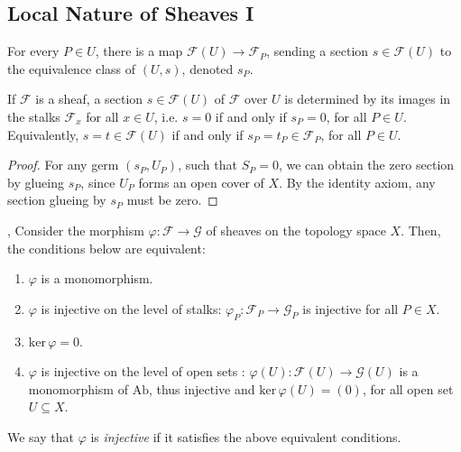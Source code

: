 \documentclass[11pt]{article}
\begin{document}
\subsection{Local Nature of Sheaves I}

\begin{lemma}
    \label{lemma: taking stalks}
    For every $P \in U$, there is a map 
    $\mathscr{F}(U) \to \mathscr{F}_{P}$, 
    sending a section $s \in \mathscr{F}(U)$ to 
    the equivalence class of $(U,s)$, denoted $s_{P}$. 

    If $\mathscr{F}$ is a sheaf, 
    a section $s \in \mathscr{F}(U)$ of $\mathscr{F}$ over $U$ 
    is determined by its images in the stalks $\mathscr{F}_{x}$ 
    for all $x \in U$, i.e. $s=0$ if and only if 
    $s_{P}=0$, for all $P \in U$. 
    Equivalently, $s=t \in \mathscr{F}(U)$ 
    if and only if $s_{P}=t_{P} \in \mathscr{F}_{P}$, 
    for all $P \in U$.
\end{lemma}

\begin{proof}
    For any germ $ (s_{P},U_{P}) $, such that $ S_{P}=0 $, 
    we can obtain the zero section by glueing $ s_{P} $, 
    since $ U_{P} $ forms an open cover of $ X $. 
    By the identity axiom, any section glueing by $ s_{P} $ 
    must be zero. 
\end{proof}

\begin{proposition}
    \label{prop: injective morphisms}
    \cite[2.4 N]{vakilTheRisingSea}, \cite[Exercise II.1.3]{hartsAG} 
    Consider the morphism $\varphi:\mathscr{F} \to \mathscr{G}$ 
    of sheaves on the topology space $X$. 
    Then, the conditions below are equivalent: 
    \begin{enumerate}[label = (\arabic*)]
    \item $\varphi$ is a monomorphism. 
    \item $\varphi$ is injective on the level 
        of stalks: $\varphi_{P}:\mathscr{F}_{P}\to \mathscr{G}_{P}$ 
        is injective for all $P \in X$. 
    \item $\mathrm{ker}\,\varphi=0$.  
    \item $\varphi$ is injective on the level of open 
    sets : $\varphi(U): \mathscr{F}(U) \to \mathscr{G}(U)$ 
    is a monomorphism of $\mathrm{Ab}$, 
    thus injective and $\mathrm{ker}\,\varphi(U) = (0)$, 
    for all open set $U \subseteq X$. 
    \end{enumerate}

    We say that $\varphi$ is \emph{injective} 
    if it satisfies the above equivalent conditions.
\end{proposition}
\end{document}
